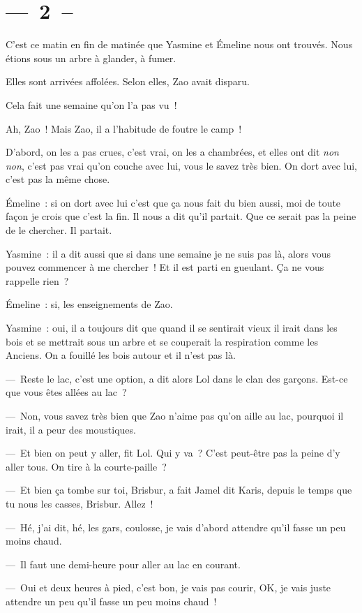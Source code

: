 \documentclass[french,twoside]{book} %
\begin{document}
\section[{— 2 –}]{— 2 –}
\renewcommand{\leftmark}{— 2 –}

\noindent C’est ce matin en fin de matinée que Yasmine et Émeline nous ont trouvés. Nous étions sous un arbre à glander, à fumer.\par
Elles sont arrivées affolées. Selon elles, Zao avait disparu.\par
Cela fait une semaine qu’on l’a pas vu !\par
Ah, Zao ! Mais Zao, il a l’habitude de foutre le camp !\par
D’abord, on les a pas crues, c’est vrai, on les a chambrées, et elles ont dit \emph{non non}, c’est pas vrai qu’on couche avec lui, vous le savez très bien. On dort avec lui, c’est pas la même chose.\par
Émeline : si on dort avec lui c’est que ça nous fait du bien aussi, moi de toute façon je crois que c’est la fin. Il nous a dit qu’il partait. Que ce serait pas la peine de le chercher. Il partait.\par
Yasmine : il a dit aussi que si dans une semaine je ne suis pas là, alors vous pouvez commencer à me chercher ! Et il est parti en gueulant. Ça ne vous rappelle rien ?\par
Émeline : si, les enseignements de Zao.\par
Yasmine : oui, il a toujours dit que quand il se sentirait vieux il irait dans les bois et se mettrait sous un arbre et se couperait la respiration comme les Anciens. On a fouillé les bois autour et il n’est pas là.\par
— Reste le lac, c’est une option, a dit alors Lol dans le clan des garçons. Est-ce que vous êtes allées au lac ?\par
— Non, vous savez très bien que Zao n’aime pas qu’on aille au lac, pourquoi il irait, il a peur des moustiques.\par
— Et bien on peut y aller, fit Lol. Qui y va ? C’est peut-être pas la peine d’y aller tous. On tire à la courte-paille ?\par
— Et bien ça tombe sur toi, Brisbur, a fait Jamel dit Karis, depuis le temps que tu nous les casses, Brisbur. Allez !\par
— Hé, j’ai dit, hé, les gars, coulosse, je vais d’abord attendre qu’il fasse un peu moins chaud.\par
— Il faut une demi-heure pour aller au lac en courant.\par
— Oui et deux heures à pied, c’est bon, je vais pas courir, OK, je vais juste attendre un peu qu’il fasse un peu moins chaud !
\end{document}
